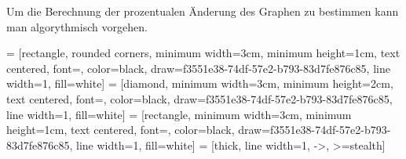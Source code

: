 Um die Berechnung der prozentualen Änderung des Graphen zu bestimmen kann man algorythmisch vorgehen.
\begin{center}	
 = [rectangle, rounded corners, minimum width=3cm, minimum height=1cm, text centered, font=\normalsize, color=black, draw=f3551e38-74df-57e2-b793-83d7fe876c85, line width=1, fill=white]
 = [diamond, minimum width=3cm, minimum height=2cm, text centered, font=\normalsize, color=black, draw=f3551e38-74df-57e2-b793-83d7fe876c85, line width=1, fill=white]
 = [rectangle, minimum width=3cm, minimum height=1cm, text centered, font=\normalsize, color=black, draw=f3551e38-74df-57e2-b793-83d7fe876c85, line width=1, fill=white]
 = [thick, line width=1, ->, >=stealth]
\end{center}